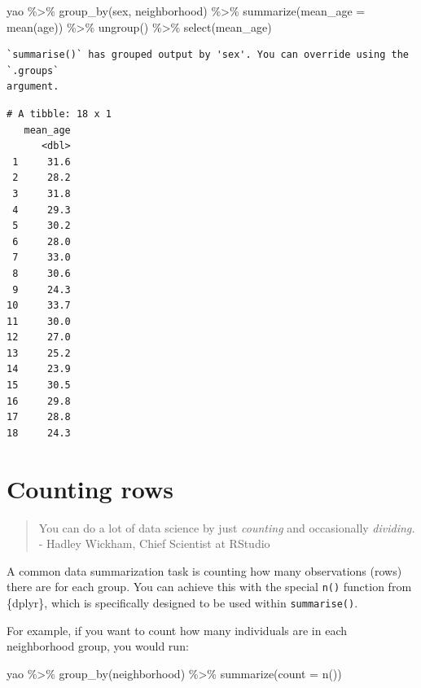 \documentclass[
  letterpaper,
  DIV=11,
  numbers=noendperiod]{scrreprt}
\newenvironment{Shaded}{\begin{snugshade}}{\end{snugshade}}
\newcommand{\AttributeTok}[1]{\textcolor[rgb]{0.40,0.45,0.13}{#1}}
\newcommand{\FunctionTok}[1]{\textcolor[rgb]{0.28,0.35,0.67}{#1}}
\newcommand{\NormalTok}[1]{\textcolor[rgb]{0.00,0.23,0.31}{#1}}
\newcommand{\SpecialCharTok}[1]{\textcolor[rgb]{0.37,0.37,0.37}{#1}}
\begin{document}
\begin{Shaded}
\begin{Highlighting}[]
\NormalTok{yao }\SpecialCharTok{\%\textgreater{}\%} 
  \FunctionTok{group\_by}\NormalTok{(sex, neighborhood) }\SpecialCharTok{\%\textgreater{}\%} 
  \FunctionTok{summarize}\NormalTok{(}\AttributeTok{mean\_age =} \FunctionTok{mean}\NormalTok{(age)) }\SpecialCharTok{\%\textgreater{}\%} 
  \FunctionTok{ungroup}\NormalTok{() }\SpecialCharTok{\%\textgreater{}\%} 
  \FunctionTok{select}\NormalTok{(mean\_age)}
\end{Highlighting}
\end{Shaded}

\begin{verbatim}
`summarise()` has grouped output by 'sex'. You can override using the `.groups`
argument.
\end{verbatim}

\begin{verbatim}
# A tibble: 18 x 1
   mean_age
      <dbl>
 1     31.6
 2     28.2
 3     31.8
 4     29.3
 5     30.2
 6     28.0
 7     33.0
 8     30.6
 9     24.3
10     33.7
11     30.0
12     27.0
13     25.2
14     23.9
15     30.5
16     29.8
17     28.8
18     24.3
\end{verbatim}

\hypertarget{counting-rows}{%
\section{Counting rows}\label{counting-rows}}

\begin{quote}
You can do a lot of data science by just \emph{counting} and
occasionally \emph{dividing.} - Hadley Wickham, Chief Scientist at
RStudio
\end{quote}

A common data summarization task is counting how many observations
(rows) there are for each group. You can achieve this with the special
\texttt{n()} function from \{dplyr\}, which is specifically designed to
be used within \texttt{summarise()}.

For example, if you want to count how many individuals are in each
neighborhood group, you would run:

\begin{Shaded}
\begin{Highlighting}[]
\NormalTok{yao }\SpecialCharTok{\%\textgreater{}\%} 
  \FunctionTok{group\_by}\NormalTok{(neighborhood) }\SpecialCharTok{\%\textgreater{}\%} 
  \FunctionTok{summarize}\NormalTok{(}\AttributeTok{count =} \FunctionTok{n}\NormalTok{())}
\end{Highlighting}
\end{Shaded}
\end{document}
